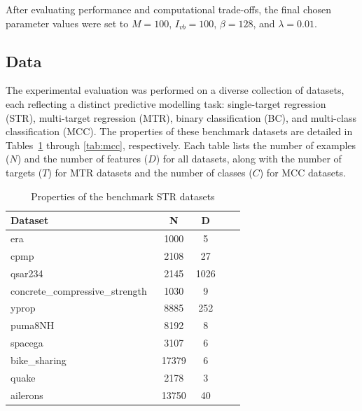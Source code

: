 \documentclass[3p,review,authoryear]{elsarticle}
\begin{document}
After evaluating performance and computational trade-offs, the final chosen parameter values were set to $M=100$, $I_{vb}=100$, $\beta=128$, and $\lambda=0.01$.


\subsection{Data}

The experimental evaluation was performed on a diverse collection of datasets, each reflecting a distinct predictive modelling task: single-target regression (STR), multi-target regression (MTR), binary classification (BC), and multi-class classification (MCC).
The properties of these benchmark datasets are detailed in Tables~\ref{tab:str} through \ref{tab:mcc}, respectively.
Each table lists the number of examples (\(N\)) and the number of features (\(D\)) for all datasets, along with the number of targets (\(T\)) for MTR datasets and the number of classes (\(C\)) for MCC datasets.

\begin{table}[h!]
\centering
\caption{Properties of the benchmark STR datasets}
\label{tab:str}
\begin{tabular}{@{}lcccc@{}}
\toprule
\textbf{Dataset}   & \textbf{N} & \textbf{D} \\ \midrule
era~\citep{openml}                  & 1000         & 5          \\
cpmp~\citep{openml}                     & 2108         & 27          \\
qsar234~\citep{openml}                   & 2145         & 1026             \\
concrete\_compressive\_strength~\citep{openml}                   & 1030         & 9          \\
yprop~\citep{openml}                   & 8885         & 252       \\
puma8NH~\citep{openml}                & 8192         & 8        \\
spacega~\citep{openml}                  & 3107         & 6             \\
bike\_sharing~\citep{openml}           & 17379         & 6            \\
quake~\citep{openml}       & 2178         & 3         \\
ailerons~\citep{openml}         & 13750         & 40           \\ \bottomrule
\end{tabular}
\end{table}
\end{document}
